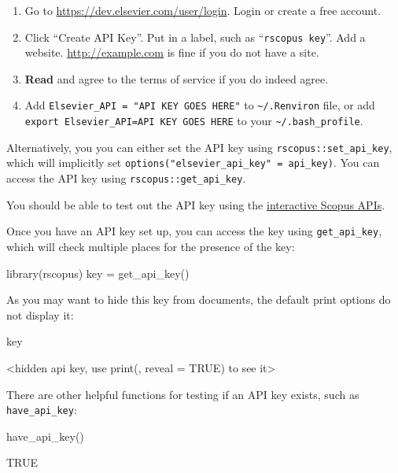 \begin{enumerate}
\def\labelenumi{\arabic{enumi}.}
\tightlist
\item
  Go to \url{https://dev.elsevier.com/user/login}. Login or create a
  free account.
\item
  Click ``Create API Key''. Put in a label, such as
  ``\texttt{rscopus\ key}''. Add a website. \url{http://example.com} is
  fine if you do not have a site.
\item
  \textbf{Read} and agree to the terms of service if you do indeed
  agree.
\item
  Add \texttt{Elsevier\_API\ =\ "API\ KEY\ GOES\ HERE"} to
  \texttt{\textasciitilde{}/.Renviron} file, or add
  \texttt{export\ Elsevier\_API=API\ KEY\ GOES\ HERE} to your
  \texttt{\textasciitilde{}/.bash\_profile}.
\end{enumerate}

Alternatively, you you can either set the API key using
\texttt{rscopus::set\_api\_key}, which will implicitly set
\texttt{options("elsevier\_api\_key"\ =\ api\_key)}. You can access the
API key using \texttt{rscopus::get\_api\_key}.

You should be able to test out the API key using the
\href{https://dev.elsevier.com/scopus.html}{interactive Scopus APIs}.

Once you have an API key set up, you can access the key using
\texttt{get\_api\_key}, which will check multiple places for the
presence of the key:

\begin{Schunk}
\begin{Sinput}
library(rscopus)
key = get_api_key()
\end{Sinput}
\end{Schunk}

As you may want to hide this key from documents, the default print
options do not display it:

\begin{Schunk}
\begin{Sinput}
key
\end{Sinput}
\begin{Soutput}
<hidden api key, use print(, reveal = TRUE) to see it>
\end{Soutput}
\end{Schunk}

There are other helpful functions for testing if an API key exists, such
as \texttt{have\_api\_key}:

\begin{Schunk}
\begin{Sinput}
have_api_key()
\end{Sinput}
\begin{Soutput}
[1] TRUE
\end{Soutput}
\end{Schunk}

